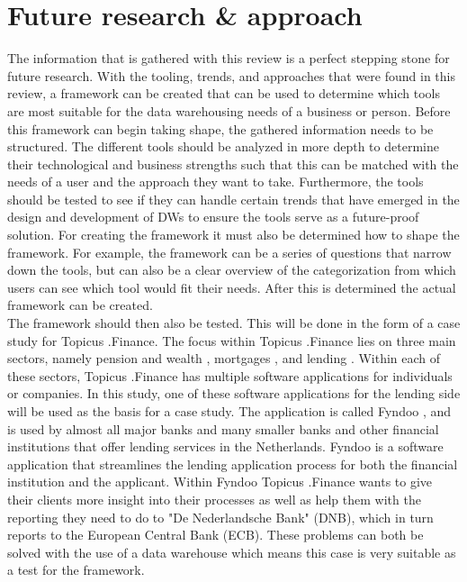 \documentclass[11pt]{article}
\begin{document}
\section{Future research \& approach}
\label{approach}
The information that is gathered with this review is a perfect stepping stone for future research. With the tooling, trends, and approaches that were found in this review, a framework can be created that can be used to determine which tools are most suitable for the data warehousing needs of a business or person. Before this framework can begin taking shape, the gathered information needs to be structured. The different tools should be analyzed in more depth to determine their technological and business strengths such that this can be matched with the needs of a user and the approach they want to take. Furthermore, the tools should be tested to see if they can handle certain trends that have emerged in the design and development of DWs to ensure the tools serve as a future-proof solution. For creating the framework it must also be determined how to shape the framework. For example, the framework can be a series of questions that narrow down the tools, but can also be a clear overview of the categorization from which users can see which tool would fit their needs. After this is determined the actual framework can be created. \\

The framework should then also be tested. This will be done in the form of a case study for Topicus .Finance. The focus within Topicus .Finance lies on three main sectors, namely pension and wealth \cite{pension},  mortgages \cite{mortgages}, and lending \cite{businesslending}. Within each of these sectors, Topicus .Finance has multiple software applications for individuals or companies. In this study, one of these software applications for the lending side will be used as the basis for a case study. The application is called Fyndoo \cite{fyndoo}, and is used by almost all major banks and many smaller banks and other financial institutions that offer lending services in the Netherlands. Fyndoo is a software application that streamlines the lending application process for both the financial institution and the applicant. Within Fyndoo Topicus .Finance wants to give their clients more insight into their processes as well as help them with the reporting they need to do to "De Nederlandsche Bank" (DNB), which in turn reports to the European Central Bank (ECB). These problems can both be solved with the use of a data warehouse which means this case is very suitable as a test for the framework. \\
\end{document}
